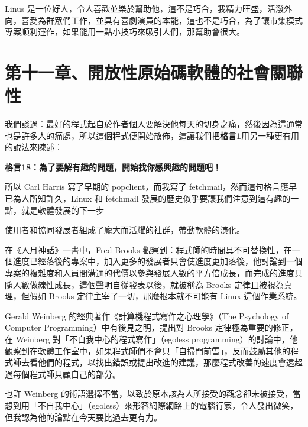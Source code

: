\documentclass[12pt,]{article}
\makeatletter
\newcommand*{\shifttext}[2]{%
  \settowidth{\@tempdima}{#2}%
  \makebox[\@tempdima]{\hspace*{#1}#2}%
}
\makeatother
\begin{document}
Linus
是一位好人，令人喜歡並樂於幫助他，這不是巧合，我精力旺盛，活潑外向，喜愛為群眾們工作，並具有喜劇演員的本能，這也不是巧合，為了讓市集模式專案順利運作，如果能用一點小技巧來吸引人們，那幫助會很大。

\newpage
\section{第十一章、開放性原始碼軟體的社會關聯性}

我們談過︰最好的程式起自於作者個人要解決他每天的切身之痛，然後因為這通常也是許多人的痛處，所以這個程式便開始散佈，這讓我們把\textbf{格言1}用另一種更有用的說法來陳述︰

\textbf{格言18︰為了要解有趣的問題，開始找你感興趣的問題吧！}

所以 Carl Harris 寫了早期的 popclient，而我寫了
fetchmail，然而這句格言應早已為人所知許久，Linux 和 fetchmail
發展的歷史似乎要讓我們注意到這有趣的一點，就是軟體發展的下一步 \shifttext{1pt}{---}\shifttext{-1pt}{---}
使用者和協同發展者組成了龐大而活耀的社群，帶動軟體的演化。

在《人月神話》一書中，Fred Brooks
觀察到︰程式師的時間具不可替換性，在一個進度已經落後的專案中，加入更多的發展者只會使進度更加落後，他討論到一個專案的複雜度和人員間溝通的代價以參與發展人數的平方倍成長，而完成的進度只隨人數做線性成長，這個聲明自從發表以後，就被稱為
Brooks 定律且被視為真理，但假如 Brooks 定律主宰了一切，那麼根本就不可能有
Linux 這個作業系統。

Gerald Weinberg 的經典著作《計算機程式寫作之心理學》（The Psychology of
Computer Programming）中有後見之明，提出對 Brooks 定律極為重要的修正，在
Weinberg 對「不自我中心的程式寫作」（egoless
programming）的討論中，他觀察到在軟體工作室中，如果程式師們不會只「自掃門前雪」，反而鼓勵其他的程式師去看他們的程式，以找出錯誤或提出改進的建議，那麼程式改善的速度會遠超過每個程式師只顧自己的部分。

也許 Weinberg
的術語選擇不當，以致於原本該為人所接受的觀念卻未被接受，當想到用「不自我中心」（egoless）來形容網際網路上的電腦行家，令人發出微笑，但我認為他的論點在今天要比過去更有力。
\end{document}
